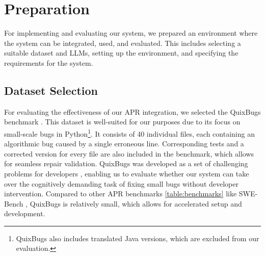 \section{Preparation}

For implementing and evaluating our system, we prepared an environment where the system can be integrated, used, and evaluated. This includes selecting a suitable dataset and \acp{LLM}, setting up the environment, and specifying the requirements for the system.

\subsection{Dataset Selection}

For evaluating the effectiveness of our APR integration, we selected the QuixBugs benchmark \cite{linQuixBugsMultilingualProgram2017}. This dataset is well-suited for our purposes due to its focus on small-scale bugs in Python\footnote{QuixBugs also includes translated Java versions, which are excluded from our evaluation.}. It consists of 40 individual files, each containing an algorithmic bug caused by a single erroneous line. Corresponding tests and a corrected version for every file are also included in the benchmark, which allows for seamless repair validation. QuixBugs was developed as a set of challenging problems for developers \cite{linQuixBugsMultilingualProgram2017}, enabling us to evaluate whether our system can take over the cognitively demanding task of fixing small bugs without developer intervention.
Compared to other APR benchmarks \ref{table:benchmarks} like SWE-Bench \cite{jimenezSWEbenchCanLanguage2024}, QuixBugs is relatively small, which allows for accelerated setup and development.

